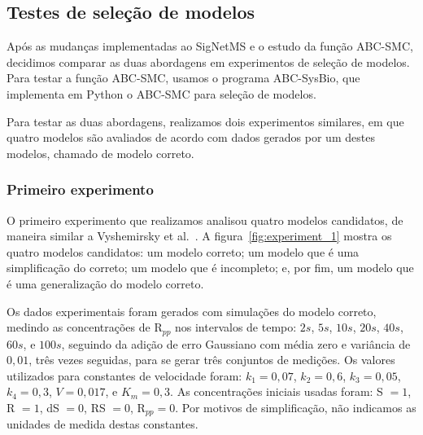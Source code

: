 \documentclass[12pt]{article}
\begin{document}
\subsection{Testes de seleção de modelos}
Após as mudanças implementadas ao SigNetMS e o estudo da função ABC-SMC,
decidimos comparar as duas abordagens em experimentos de seleção de
modelos. Para testar a função ABC-SMC, usamos o programa ABC-SysBio, que
implementa em Python o ABC-SMC para seleção de modelos.

Para testar as duas abordagens, realizamos dois experimentos similares,
em que quatro modelos são avaliados de acordo com dados gerados por um
destes modelos, chamado de modelo correto.

\subsubsection{Primeiro experimento}
O primeiro experimento que realizamos analisou quatro modelos 
candidatos, de maneira similar a Vyshemirsky et 
al.~\cite{Vyshemirsky2008}. A figura~\ref{fig:experiment_1} mostra os
quatro modelos candidatos: um modelo correto; um modelo que é uma
simplificação do correto; um modelo que é incompleto; e, por fim, um
modelo que é uma generalização do modelo correto.

Os dados experimentais foram gerados com simulações do modelo correto,
medindo as concentrações de R$_{pp}$ nos intervalos de tempo: $2s$,
$5s$, $10s$, $20s$, $40s$, $60s$, e $100s$, seguindo da adição de erro
Gaussiano com média zero e variância de $0,01$, três vezes seguidas,
para se gerar três conjuntos de medições. Os valores utilizados para 
constantes de velocidade foram: $k_1 = 0,07$, $k_2 = 0,6$, $k_3 = 0,05$,
$k_4 = 0,3$, $V = 0,017$, e $K_m = 0,3$. As concentrações iniciais
usadas foram: S $= 1$, R $= 1$, dS $= 0$, RS $= 0$, R$_{pp} = 0$. Por
motivos de simplificação, não indicamos as unidades de medida destas
constantes.
\end{document}
